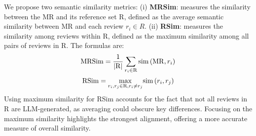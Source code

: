 We propose two semantic similarity metrics:
(i) \textbf{MRSim}: measures the similarity between the MR and its reference set R, defined as the average semantic similarity between MR and each review $r_i \in R$.
(ii) \textbf{RSim}: measures the similarity among reviews within R, defined as the maximum similarity among all pairs of reviews in R. The formulas are:
\begin{equation}
\small{\mathrm{MRSim}=\frac{1}{\left| \mathrm{R} \right|}\sum_{r_i\in \mathrm{R}}{\mathrm{sim} \left( \mathrm{MR}, r_i \right)} }
\end{equation}
\begin{equation}
\small{\mathrm{RSim}=\underset{r_i,r_j\in \mathrm{R},r_i\ne r_j}{\max}\mathrm{sim} \left( r_i, r_j \right) }
\end{equation}
Using maximum similarity for RSim accounts for the fact that not all reviews in R are LLM-generated, as averaging could obscure key differences. Focusing on the maximum similarity highlights the strongest alignment, offering a more accurate measure of overall similarity.




